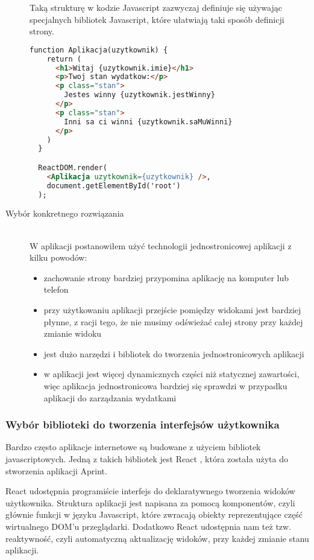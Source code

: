 \begin{description}
  Taką strukturę w kodzie Javascript zazwyczaj definiuje się używając specjalnych bibliotek Javascript, które ułatwiają taki sposób definicji strony.

  \begin{lstlisting}[language=HTML, caption=Przykład aplikacji z użyciem biblioteki javascriptowej, label={lst:reactCode}]
  function Aplikacja(uzytkownik) {
    return (
      <h1>Witaj {uzytkownik.imie}</h1>
      <p>Twoj stan wydatkow:</p>
      <p class="stan">
        Jestes winny {uzytkownik.jestWinny}
      </p>
      <p class="stan">
        Inni sa ci winni {uzytkownik.saMuWinni}
      </p>
    )
  }

  ReactDOM.render(
    <Aplikacja uzytkownik={uzytkownik} />,
    document.getElementById('root')
  );
  \end{lstlisting}
  \item[Wybór konkretnego rozwiązania] \hfill \\ W aplikacji postanowiłem użyć technologii jednostronicowej aplikacji z kilku powodów:
  \begin{itemize}
    \item zachowanie strony bardziej przypomina aplikację na komputer lub telefon
    \item przy użytkowaniu aplikacji przejście pomiędzy widokami jest bardziej płynne, z racji tego, że nie musimy odświeżać całej strony przy każdej zmianie widoku
    \item jest dużo narzędzi i bibliotek do tworzenia jednostronicowych aplikacji
    \item w aplikacji jest więcej dynamicznych części niż statycznej zawartości, więc aplikacja jednostronicowa bardziej się sprawdzi w przypadku aplikacji do zarządzania wydatkami
  \end{itemize}
\end{description}

\subsubsection{Wybór biblioteki do tworzenia interfejsów użytkownika}
Bardzo często aplikacje internetowe są budowane z użyciem bibliotek javascriptowych. Jedną z takich bibliotek jest React \cite{ref_react_doc}, która została użyta do stworzenia aplikacji Aprint.

React udostępnia programiście interfejs do deklaratywnego tworzenia widoków użytkownika. Struktura aplikacji jest napisana za pomocą komponentów, czyli głównie funkcji w języku Javascript, które zwracają obiekty reprezentujące część wirtualnego DOM'u przeglądarki. Dodatkowo React udostępnia nam też tzw. reaktywność, czyli automatyczną aktualizację widoków, przy każdej zmianie stanu aplikacji.

